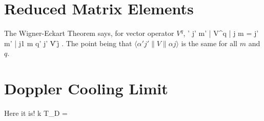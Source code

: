 \section{Reduced Matrix Elements}
The Wigner-Eckart Theorem says, for vector operator $V^q$,
\beq
\langle \alpha ' j' m' | V^q | \alpha j m \rangle = \langle j' m' | j1 m q\rangle \langle \alpha ' j' \| V \|\alpha j \rangle .
\eeq
The point being that $\langle \alpha ' j' \| V \|\alpha j \rangle$ is the same for all $m$ and $q$.


\section{Doppler Cooling Limit}
Here it is!
\beq
k T_{\textrm{D}} =  \hbar \Gamma
\eeq

%
%
%
